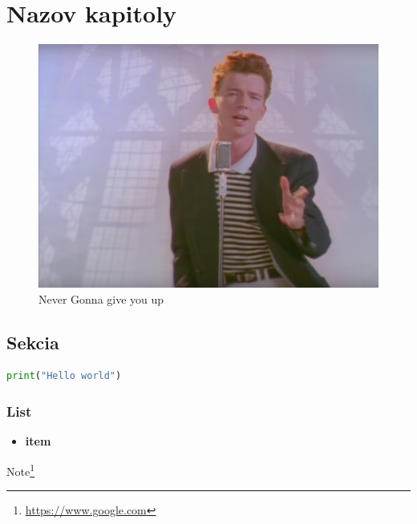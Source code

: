 \chapter{Nazov kapitoly}

\begin{figure}[!ht]
  \centering
  \includegraphics[width=.5\textwidth]{figures/picture.png}
  \caption{Never Gonna give you up\cite{rick}\label{Rick Astley}}
\end{figure}

\section{Sekcia}

\begin{lstlisting}[language=Python,caption={Kód}]
  print("Hello world")
\end{lstlisting}

\subsection{List}
\begin{itemize}
  \item \textbf{item}
\end{itemize}

Note\footnote{\url{https://www.google.com}} 
